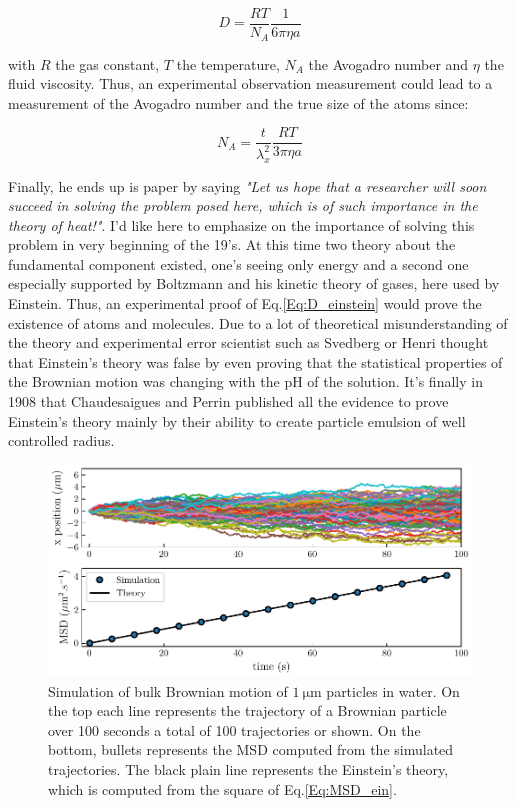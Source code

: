 \begin{equation}
	D = \frac{R T}{N_A}\frac{1}{6\pi \eta a}
	\label{Eq:D_einstein}
\end{equation}

with $R$ the gas constant, $T$ the temperature, $N_A$ the Avogadro number and $\eta$ the fluid viscosity. Thus, an experimental observation measurement could lead to a measurement of the Avogadro number and the true size of the atoms since:

\begin{equation}
	N_A = \frac{t}{\lambda_x^2} \frac{RT}{3\pi \eta a}
\end{equation}

Finally, he ends up is paper \cite{einstein_uber_1905} by saying \textit{"Let us hope that a researcher will soon succeed in solving the problem posed here, which is of such importance in the theory of heat!"}. I'd like here to emphasize on the importance of solving this problem in very beginning of the 19's. At this time two theory about the fundamental component existed, one's seeing only energy and a second one especially supported by Boltzmann and his kinetic theory of gases, here used by Einstein. Thus, an experimental proof of Eq.\ref{Eq:D_einstein} would prove the existence of atoms and molecules. Due to a lot of theoretical misunderstanding of the theory and experimental error scientist such as Svedberg or Henri thought that Einstein's theory was false \cite{genthon_concept_2020} by even proving that the statistical properties of the Brownian motion was changing with the pH of the solution. It's finally in 1908 that Chaudesaigues and Perrin published all the evidence to prove Einstein's theory mainly by their ability to create particle emulsion of well controlled radius. 

\begin{figure}[!h]
	\centering
	\includegraphics{02_body/chapter1/image/brown_exemple.pdf}
	\caption{Simulation of bulk Brownian motion of $1 ~ \mathrm{\mu m}$ particles in water. On the top each line represents the trajectory of a Brownian particle over 100 seconds a total of 100 trajectories or shown. On the bottom, bullets represents the \gls{MSD} computed from the simulated trajectories. The black plain line represents the Einstein's theory, which is computed from the square of Eq.\ref{Eq:MSD_ein}.}
\end{figure}


